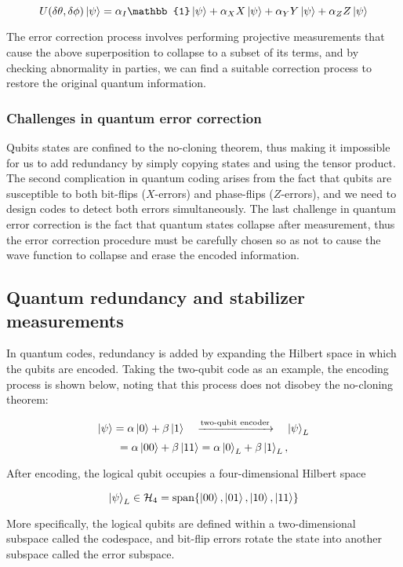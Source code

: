 \documentclass[final,5p,times,twocolumn,authoryear]{elsarticle}
\begin{document}
\[
    U(\delta \theta, \delta \phi) \ket{\psi} = \alpha_{I} \mathbb{1} \ket{\psi} + \alpha_{X} X \ket{\psi} + \alpha_{Y} Y \ket{\psi} + \alpha_{Z} Z \ket{\psi}
\]

The error correction process involves performing projective measurements that cause the above superposition to collapse to a subset of its terms, and by checking abnormality in parties, we can find a suitable correction process to restore the original quantum information.

\subsubsection{Challenges in quantum error correction}

Qubits states are confined to the no-cloning theorem, thus making it impossible for us to add redundancy by simply copying states and using the tensor product. The second complication in quantum coding arises from the fact that qubits are susceptible to both bit-flips ($X$-errors) and phase-flips ($Z$-errors),  and we need to design codes to detect both errors simultaneously. The last challenge in quantum error correction is the fact that quantum states collapse after measurement, thus the error correction procedure must be carefully chosen so as not to cause the wave function to collapse and erase the encoded information.

\subsection{Quantum redundancy and stabilizer measurements}

In quantum codes, redundancy is added by expanding the Hilbert space in which the qubits are encoded. Taking the two-qubit code as an example, the encoding process is shown below, noting that this process does not disobey the no-cloning theorem:

\[
    \ket{\psi} = \alpha \ket{0} + \beta \ket{1}
    \quad
    \xrightarrow{\text{two-qubit encoder}}
    \quad
    \ket{\psi}_L
\]
\[
    = \alpha \ket{00} + \beta \ket{11} = \alpha \ket{0}_L + \beta \ket{1}_L,
\]

After encoding, the logical qubit occupies a four-dimensional Hilbert space

\[
    \ket{\psi}_L \in \mathcal{H}_4 = \text{span}\{\ket{00}, \ket{01}, \ket{10}, \ket{11}\}
\]

More specifically, the logical qubits are defined within a two-dimensional subspace called the codespace, and bit-flip errors rotate the state into another subspace called the error subspace.
\end{document}
